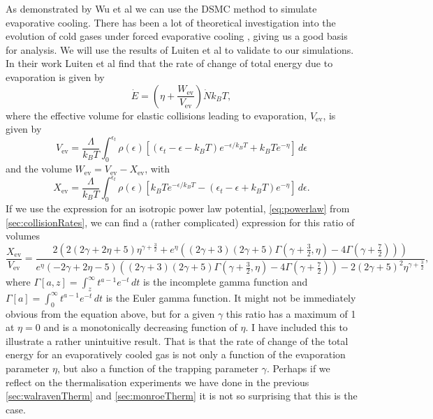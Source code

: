 As demonstrated by Wu et al \cite{Wu1996, Wu1997} we can use the DSMC method to simulate evaporative cooling.
There has been a lot of theoretical investigation into the evolution of cold gases under forced evaporative cooling \cite{Davis1995, Luiten1996, Holland1996}, giving us a good basis for analysis.
We will use the results of Luiten et al \cite{Luiten1996} to validate to our simulations.
In their work Luiten et al find that the rate of change of total energy due to evaporation is given by 
\begin{equation}    
    \dot{E} = \left( \eta + \frac{W_{\mathrm{ev}}}{V_{\mathrm{ev}}}\right) \dot{N} k_B T, \label{eq:evapEnergy}
\end{equation}
where the effective volume for elastic collisions leading to evaporation, $V_\mathrm{ev}$, is given by
\begin{equation*}
    V_\mathrm{ev} = \frac{\Lambda}{k_B T} \int_0^{\epsilon_t} \rho(\epsilon)\left[\left(\epsilon_t-\epsilon-k_B T\right)e^{-\epsilon/k_B T} + k_B T e^{-\eta}\right]\,d\epsilon
\end{equation*}
and the volume $W_\mathrm{ev} = V_\mathrm{ev} - X_\mathrm{ev} $, with
\begin{equation*}
    X_\mathrm{ev} = \frac{\Lambda}{k_B T} \int_0^{\epsilon_t} \rho(\epsilon)\left[k_B Te^{-\epsilon/k_B T}  - \left(\epsilon_t-\epsilon+k_B T\right)e^{-\eta}\right]\,d\epsilon.
\end{equation*}
If we use the expression for an isotropic power law potential, \autoref{eq:powerlaw} from \autoref{sec:collisionRates}, we can find a (rather complicated) expression for this ratio of volumes
\begin{equation*}
    \frac{X_\mathrm{ev}}{V_\mathrm{ev}} = \frac{2 \left(2 (2 \gamma +2 \eta +5) \eta ^{\gamma +\frac{3}{2}}+e^{\eta } \left((2 \gamma +3) (2 \gamma +5) \Gamma \left(\gamma +\frac{3}{2},\eta \right)-4 \Gamma \left(\gamma +\frac{7}{2}\right)\right)\right)}{e^{\eta } (-2 \gamma +2 \eta -5) \left((2 \gamma +3) (2 \gamma +5) \Gamma \left(\gamma +\frac{3}{2},\eta \right)-4 \Gamma \left(\gamma +\frac{7}{2}\right)\right)-2 (2 \gamma +5)^2 \eta ^{\gamma +\frac{3}{2}}},
\end{equation*}
where $\Gamma\left[a,z\right] = \int_z^\infty t^{a-1}e^{-t}\,dt$ is the incomplete gamma function and $\Gamma\left[a\right] = \int_0^\infty t^{a-1}e^{-t}\,dt$ is the Euler gamma function.
It might not be immediately obvious from the equation above, but for a given $\gamma$ this ratio has a maximum of 1 at $\eta=0$ and is a monotonically decreasing function of $\eta$.
I have included this to illustrate a rather unintuitive result.
That is that the rate of change of the total energy for an evaporatively cooled gas is not only a function of the evaporation parameter $\eta$, but also a function of the trapping parameter $\gamma$.
Perhaps if we reflect on the thermalisation experiments we have done in the previous \autoref{sec:walravenTherm} and \autoref{sec:monroeTherm} it is not so surprising that this is the case.

